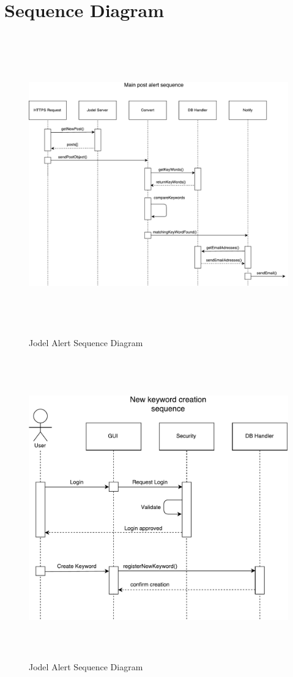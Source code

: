 \documentclass[a4paper,12pt]{article}
\begin{document}
\section{Sequence Diagram}
\begin{figure}[!h]
	\centering
	\includegraphics[height=13cm]{img/sequence_diagram1.pdf}
	\caption{Jodel Alert Sequence Diagram}
	\label{Sequence Diagram}
\end{figure}
\clearpage
\begin{figure}[!h]
	\centering
	\includegraphics[height=13cm]{img/sequence_diagram2.pdf}
	\caption{Jodel Alert Sequence Diagram}
	\label{Sequence Diagram}
\end{figure}
\clearpage
\end{document}
